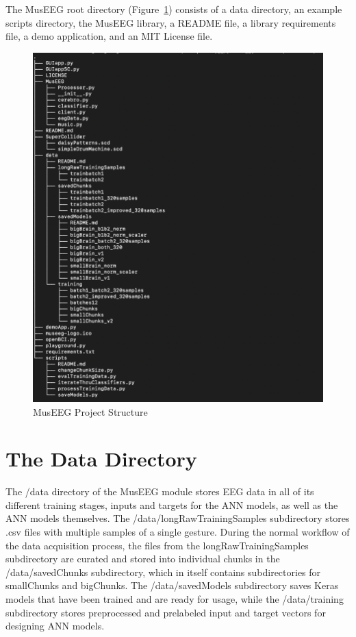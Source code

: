 

The MusEEG root directory (Figure~\ref{fig:projectStructure})  consists of a data directory, an example scripts directory, the MusEEG library, a README file, a library requirements file, a demo application, and an MIT License file.

 \begin{figure}[H]
	\centering
		\includegraphics[width=0.8\columnwidth]{projectStructure.png}
	\caption{MusEEG Project Structure}
	\label{fig:projectStructure}
\end{figure} 

\pagebreak

\section{The Data Directory}
The /data directory of the MusEEG module stores EEG data in all of its different training stages, inputs and targets for the ANN models, as well as the ANN models themselves. The /data/longRawTrainingSamples subdirectory stores .csv files with multiple samples of a single gesture. During the normal workflow of the data acquisition process, the files from the longRawTrainingSamples subdirectory are curated and stored into individual chunks in the /data/savedChunks subdirectory, which in itself contains subdirectories for smallChunks and bigChunks. The /data/savedModels subdirectory saves Keras models that have been trained and are ready for usage, while the /data/training subdirectory stores preprocessed and prelabeled input and target vectors for designing ANN models.



